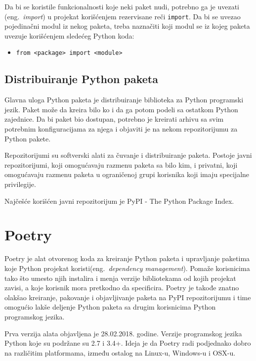 \documentclass[12pt]{report}
\begin{document}
Da bi se koristile funkcionalnosti koje neki paket nudi, potrebno ga je uvezati (eng.\ \textit{import}) u projekat korišćenjem rezervisane reči \texttt{import}. Da bi se uvezao pojedinačni modul iz nekog paketa, treba naznačiti koji modul se iz kojeg paketa uvezuje korišćenjem sledećeg Python koda:

\begin{itemize}
    \item \texttt{from <package> import <module>}
\end{itemize}

\subsection{Distribuiranje Python paketa}

Glavna uloga Python paketa je distribuiranje biblioteka za Python programski jezik. Paket može da kreira bilo ko i da ga potom podeli sa ostatkom Python zajednice. Da bi paket bio dostupan, potrebno je kreirati arhivu sa svim potrebnim konfiguracijama za njega i objaviti je na nekom repozitorijumu za Python pakete.

Repozitorijumi su softverski alati za čuvanje i distribuiranje paketa. Postoje javni repozitorijumi, koji omogućavaju razmenu paketa sa bilo kim, i privatni, koji omogućavaju razmenu paketa u ograničenoj grupi korisnika koji imaju specijalne privilegije.

Najčešće korišćen javni repozitorijum je PyPI \cite{pypi}  - The Python Package Index.

\section{Poetry}
Poetry \cite{poetry} je alat otvorenog koda za kreiranje Python paketa i upravljanje paketima koje Python projekat koristi(eng.\ \textit{dependency management}). Pomaže korisnicima tako što umesto njih instalira i menja verzije  bibliotekama od kojih projekat zavisi, a koje korisnik mora pretkodno da specificira. Poetry je takođe znatno olakšao kreiranje, pakovanje i objavljivanje paketa na PyPI repozitorijumu i time omogućio lakše deljenje Python paketa sa drugim korisnicima Python programskog jezika.

Prva verzija alata objavljena je 28.02.2018. godine. Verzije programskog jezika Python koje su podržane su 2.7 i 3.4+. Ideja je da Poetry radi podjednako dobro na različitim platformama, između ostalog na Linux-u, Windows-u i OSX-u.
\end{document}
